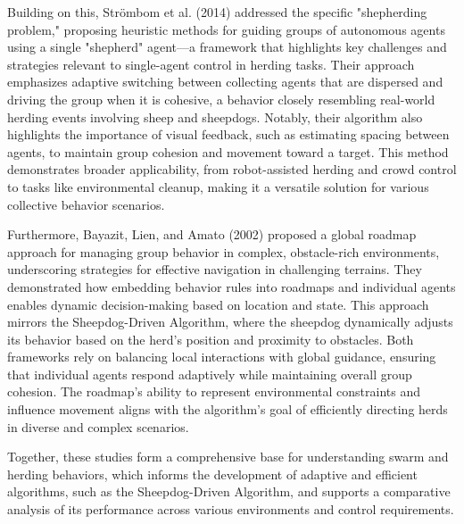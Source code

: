 \documentclass[9pt]{pnas-new}
\begin{document}
Building on this, Strömbom et al. (2014) \cite{Strmbom2014SolvingTS} addressed the specific "shepherding problem," proposing heuristic methods for guiding groups of autonomous agents using a single "shepherd" agent—a framework that highlights key challenges and strategies relevant to single-agent control in herding tasks. Their approach emphasizes adaptive switching between collecting agents that are dispersed and driving the group when it is cohesive, a behavior closely resembling real-world herding events involving sheep and sheepdogs. Notably, their algorithm also highlights the importance of visual feedback, such as estimating spacing between agents, to maintain group cohesion and movement toward a target. This method demonstrates broader applicability, from robot-assisted herding and crowd control to tasks like environmental cleanup, making it a versatile solution for various collective behavior scenarios.


Furthermore, Bayazit, Lien, and Amato (2002) \cite{bayazit2002} proposed a global roadmap approach for managing group behavior in complex, obstacle-rich environments, underscoring strategies for effective navigation in challenging terrains. They demonstrated how embedding behavior rules into roadmaps and individual agents enables dynamic decision-making based on location and state. This approach mirrors the Sheepdog-Driven Algorithm, where the sheepdog dynamically adjusts its behavior based on the herd’s position and proximity to obstacles. Both frameworks rely on balancing local interactions with global guidance, ensuring that individual agents respond adaptively while maintaining overall group cohesion. The roadmap's ability to represent environmental constraints and influence movement aligns with the algorithm's goal of efficiently directing herds in diverse and complex scenarios.

Together, these studies form a comprehensive base for understanding swarm and herding behaviors, which informs the development of adaptive and efficient algorithms, such as the Sheepdog-Driven Algorithm, and supports a comparative analysis of its performance across various environments and control requirements.
\end{document}
